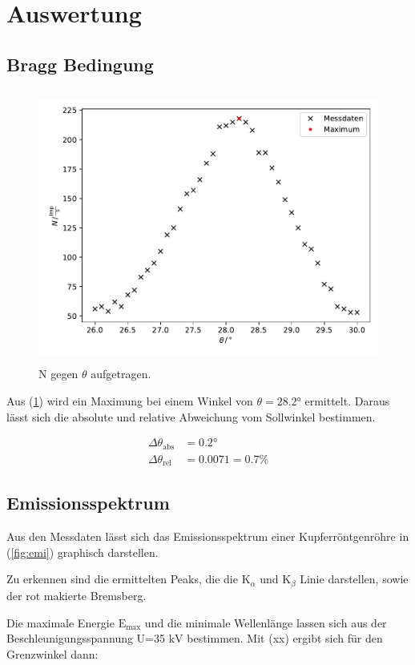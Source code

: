 \newpage
\section{Auswertung}
\subsection{Bragg Bedingung}

\begin{figure}
    \centering
       \includegraphics[height=9cm]{daten/Bragg.pdf}
       \caption{N gegen $\theta$ aufgetragen.}
       \label{fig:bragg}
\end{figure}

\noindent
Aus (\ref{fig:bragg}) wird ein Maximung bei einem Winkel von $\theta=28.2°$ ermittelt.
Daraus lässt sich die absolute und relative Abweichung vom Sollwinkel bestimmen.

\begin{align*}
\Delta\theta_{\text{abs}}&=0.2°\\
\Delta\theta_{\text{rel}}&=0.0071=0.7\%
\end{align*}

\subsection{Emissionsspektrum}
\noindent
Aus den Messdaten lässt sich das Emissionsspektrum einer Kupferröntgenröhre in (\ref{fig:emi}) graphisch darstellen.


\noindent
Zu erkennen sind die ermittelten Peaks, die die $\text{K}_\alpha$ und $\text{K}_\beta$ Linie darstellen, sowie der rot makierte Bremsberg.

\noindent
Die maximale Energie $\text{E}_\text{max}$ und die minimale Wellenlänge lassen sich aus der Beschleunigungsspannung U=35 $\si{\kilo\volt}$ bestimmen. 
Mit (xx) ergibt sich für den Grenzwinkel dann:

